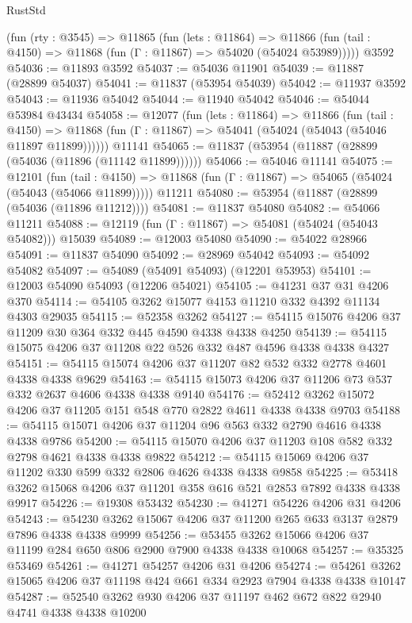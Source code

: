 \begin{lexlean}{RustStd}
\begin{coremodule}
    (fun (rty : @3545) =>
    @11865
      (fun (lets : @11864) =>
      @11866 (fun (tail : @4150) => @11868 (fun (Γ : @11867) => @54020 (@54024 @53989)))))
    @3592
@54036 := @11893 @3592
@54037 := @54036 @11901
@54039 := @11887 (@28899 @54037)
@54041 := @11837 (@53954 @54039)
@54042 := @11937 @3592
@54043 := @11936 @54042
@54044 := @11940 @54042
@54046 := @54044 @53984 @43434
@54058 := @12077
    (fun (lets : @11864) =>
    @11866
      (fun (tail : @4150) =>
      @11868 (fun (Γ : @11867) => @54041 (@54024 (@54043 (@54046 @11897 @11899))))))
    @11141
@54065 := @11837 (@53954 (@11887 (@28899 (@54036 (@11896 (@11142 @11899))))))
@54066 := @54046 @11141
@54075 := @12101
    (fun (tail : @4150) => @11868 (fun (Γ : @11867) => @54065 (@54024 (@54043 (@54066 @11899)))))
    @11211
@54080 := @53954 (@11887 (@28899 (@54036 (@11896 @11212))))
@54081 := @11837 @54080
@54082 := @54066 @11211
@54088 := @12119 (fun (Γ : @11867) => @54081 (@54024 (@54043 @54082))) @15039
@54089 := @12003 @54080
@54090 := @54022 @28966
@54091 := @11837 @54090
@54092 := @28969 @54042
@54093 := @54092 @54082
@54097 := @54089 (@54091 @54093) (@12201 @53953)
@54101 := @12003 @54090 @54093 (@12206 @54021)
@54105 := @41231 @37 @31 @4206 @370
@54114 := @54105 @3262 @15077 @4153 @11210 @332 @4392 @11134 @4303 @29035
@54115 := @52358 @3262
@54127 := @54115 @15076 @4206 @37 @11209 @30 @364 @332 @445 @4590 @4338 @4338 @4250
@54139 := @54115 @15075 @4206 @37 @11208 @22 @526 @332 @487 @4596 @4338 @4338 @4327
@54151 := @54115 @15074 @4206 @37 @11207 @82 @532 @332 @2778 @4601 @4338 @4338 @9629
@54163 := @54115 @15073 @4206 @37 @11206 @73 @537 @332 @2637 @4606 @4338 @4338 @9140
@54176 := @52412 @3262 @15072 @4206 @37 @11205 @151 @548 @770 @2822 @4611 @4338 @4338 @9703
@54188 := @54115 @15071 @4206 @37 @11204 @96 @563 @332 @2790 @4616 @4338 @4338 @9786
@54200 := @54115 @15070 @4206 @37 @11203 @108 @582 @332 @2798 @4621 @4338 @4338 @9822
@54212 := @54115 @15069 @4206 @37 @11202 @330 @599 @332 @2806 @4626 @4338 @4338 @9858
@54225 := @53418 @3262 @15068 @4206 @37 @11201 @358 @616 @521 @2853 @7892 @4338 @4338 @9917
@54226 := @19308 @53432
@54230 := @41271 @54226 @4206 @31 @4206
@54243 := @54230 @3262 @15067 @4206 @37 @11200 @265 @633 @3137 @2879 @7896 @4338 @4338 @9999
@54256 := @53455 @3262 @15066 @4206 @37 @11199 @284 @650 @806 @2900 @7900 @4338 @4338 @10068
@54257 := @35325 @53469
@54261 := @41271 @54257 @4206 @31 @4206
@54274 := @54261 @3262 @15065 @4206 @37 @11198 @424 @661 @334 @2923 @7904 @4338 @4338 @10147
@54287 := @52540 @3262 @930 @4206 @37 @11197 @462 @672 @822 @2940 @4741 @4338 @4338 @10200

\end{coremodule}
\end{lexlean}
